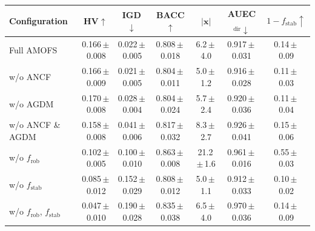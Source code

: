 \begin{tabular}{lcccccc}
\toprule
Configuration & HV$\uparrow$ & IGD$\downarrow$ & BACC$\uparrow$ & $|\mathbf{x}|$ & AUEC$_{\mathrm{dir}}\downarrow$ & $1-f_{\mathrm{stab}}\uparrow$ \\
\midrule
Full AMOFS & 0.166\,$\pm$\,0.008 & 0.022\,$\pm$\,0.005 & 0.808\,$\pm$\,0.018 & 6.2\,$\pm$\,4.0 & 0.917\,$\pm$\,0.031 & 0.14\,$\pm$\,0.09 \\
w/o ANCF & 0.166\,$\pm$\,0.009 & 0.021\,$\pm$\,0.005 & 0.804\,$\pm$\,0.011 & 5.0\,$\pm$\,1.2 & 0.916\,$\pm$\,0.028 & 0.11\,$\pm$\,0.03 \\
w/o AGDM & 0.170\,$\pm$\,0.008 & 0.028\,$\pm$\,0.004 & 0.804\,$\pm$\,0.024 & 5.7\,$\pm$\,2.4 & 0.920\,$\pm$\,0.036 & 0.11\,$\pm$\,0.04 \\
w/o ANCF \& AGDM & 0.158\,$\pm$\,0.008 & 0.041\,$\pm$\,0.006 & 0.817\,$\pm$\,0.032 & 8.3\,$\pm$\,2.7 & 0.926\,$\pm$\,0.041 & 0.15\,$\pm$\,0.06 \\
w/o $f_{\mathrm{rob}}$ & 0.102\,$\pm$\,0.005 & 0.100\,$\pm$\,0.010 & 0.863\,$\pm$\,0.008 & 21.2\,$\pm$\,1.6 & 0.961\,$\pm$\,0.016 & 0.55\,$\pm$\,0.03 \\
w/o $f_{\mathrm{stab}}$ & 0.085\,$\pm$\,0.012 & 0.152\,$\pm$\,0.029 & 0.808\,$\pm$\,0.012 & 5.0\,$\pm$\,1.1 & 0.912\,$\pm$\,0.033 & 0.10\,$\pm$\,0.02 \\
w/o $f_{\mathrm{rob}}$, $f_{\mathrm{stab}}$ & 0.047\,$\pm$\,0.010 & 0.190\,$\pm$\,0.028 & 0.835\,$\pm$\,0.038 & 6.5\,$\pm$\,4.0 & 0.970\,$\pm$\,0.036 & 0.14\,$\pm$\,0.09 \\
\bottomrule
\end{tabular}
